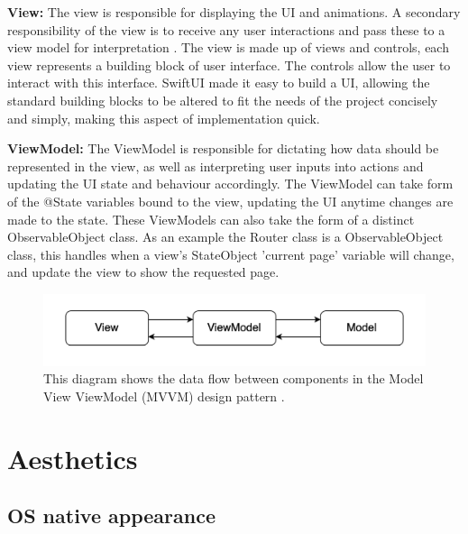 \documentclass{l4proj}
\begin{document}
\textbf{View:} The view is responsible for displaying the UI and animations. A secondary responsibility of the view is to receive any user interactions and pass these to a view model for interpretation \citep{bulavin_modern_2020}. The view is made up of views and controls, each view represents a building block of user interface. The controls allow the user to interact with this interface. SwiftUI made it easy to build a UI, allowing the standard building blocks to be altered to fit the needs of the project concisely and simply, making this aspect of implementation quick.

\textbf{ViewModel:} The ViewModel is responsible for dictating how data should be represented in the view, as well as interpreting user inputs into actions and updating the UI state and behaviour accordingly. The ViewModel can take form of the @State variables bound to the view, updating the UI anytime changes are made to the state. These ViewModels can also take the form of a distinct ObservableObject class. As an example the Router class is a ObservableObject class, this handles when a view's StateObject 'current page' variable will change, and update the view to show the requested page. 

\begin{figure}
    \centering
    \includegraphics[scale=0.5]{images/MVVMDataFlow.png}    
    \caption{This diagram shows the data flow between components in the Model View ViewModel (MVVM) design pattern 
    \citep{bulavin_modern_2020}.}
    \label{fig:MVVMDataFlow} 
\end{figure}


\section{Aesthetics}

\subsection{OS native appearance}
\end{document}
